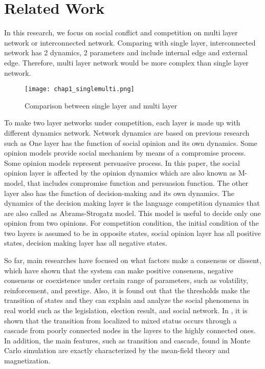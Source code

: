 \section{Related Work}
In this research, we focus on social conflict and competition on multi layer network or interconnected network. Comparing with single layer, interconnected network has 2 dynamics, 2 parameters and include internal edge and external edge. Therefore, multi layer network would be more complex than single layer network.
\begin{figure}[!htb]
	\centering
	\texttt{[image: chap1\_singlemulti.png]}
	\caption{Comparison between single layer and multi layer}
	\label{chap1_singlemulti}
\end{figure}
To make two layer networks under competition, each layer is made up with different dynamics network. Network dynamics are based on previous research such as \cite{alvarez2016} One layer has the function of social opinion and its own dynamics. Some opinion models provide social mechanism by means of a compromise process.\cite{naim2003} Some opinion models represent persuasive process.\cite{chau2014} In this paper, the social opinion layer is affected by the opinion dynamics which are also known as M-model\cite{rocca2014}, that includes compromise function and persuasion function. The other layer also has the function of decision-making and its own dynamics. The dynamics of the decision making layer is the language competition dynamics that are also called as Abrams-Strogatz model\cite{abrams2003, vazquez2010, patriarca2012}. This model is useful to decide only one opinion from two opinions. For competition condition, the initial condition of the two layers is assumed to be in opposite states, social opinion layer has all positive states, decision making layer has all negative states.

So far, main researches have focused on what factors make a consensus or dissent, which have shown that the system can make positive consensus, negative consensus or coexistence under certain range of parameters, such as volatility, reinforcement, and prestige. Also, it is found out that the thresholds make the transition of states and they can explain and analyze the social phenomena in real world such as the legislation, election result, and social network\cite{alvarez2016, amato2017, diep2017}. In \cite{gomez2015}, it is shown that the transition from localized to mixed status occurs through a cascade from poorly connected nodes in the layers to the highly connected ones. In addition, the main features, such as transition and cascade, found in Monte Carlo simulation are exactly characterized by the mean-field theory and magnetization\cite{alvarez2016, diep2017, amato2017, gomez2015}.

